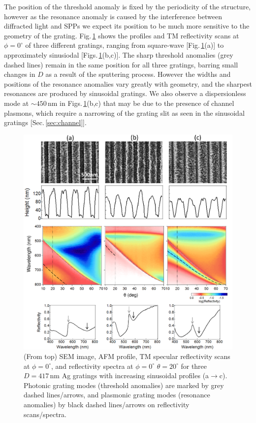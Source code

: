 The position of the threshold anomaly is fixed by the periodicity of the structure, however as the resonance anomaly is caused by the interference between diffracted light and SPPs we expect its position to be much more sensitive to the geometry of the grating. Fig.\,\ref{7Fig10} shows the profiles and TM reflectivity scans at $\phi=0^{\circ}$ of three different gratings, ranging from square-wave [Fig.\,\ref{7Fig10}(a)] to approximately sinusiodal [Figs.\,\ref{7Fig10}(b,c)]. The sharp threshold anomalies (grey dashed lines) remain in the same position for all three gratings, barring small changes in $D$ as a result of the sputtering process. However the widths and positions of the resonance anomalies vary greatly with geometry, and the sharpest resonances are produced by sinusoidal gratings. We also observe a dispersionless mode at $\sim450$\,nm in Figs.\,\ref{7Fig10}(b,c) that may be due to the presence of channel plasmons, which require a narrowing of the grating slit as seen in the sinusoidal gratings [Sec.\,\ref{sec:channel}].
\begin{figure}[h!p] 
\centering    
\includegraphics[width=\textwidth]{Fig10}
\caption[Effect of grating geometry on the optical spectra of $D=417$\,nm Ag gratings.] {(From top) SEM image, AFM profile, TM specular reflectivity scans at $\phi=0^{\circ}$, and reflectivity spectra at $\phi=0^{\circ}$ $\theta=20^{\circ}$ for three $D=417$\,nm Ag gratings with increasing sinusoidal profiles (a$\rightarrow$c). Photonic grating modes (threshold anomalies) are marked by grey dashed lines/arrows, and plasmonic grating modes (resonance anomalies) by black dashed lines/arrows on reflectivity scans/spectra.}
\label{7Fig10}
\end{figure}

